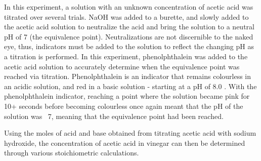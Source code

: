 In this experiment, a solution with an unknown concentration of acetic acid was titrated over several trials. NaOH was added to a burette, and slowly added to the acetic acid solution to neutralize the acid and bring the solution to a neutral pH of 7 (the equivalence point). Neutralizations are not discernible to the naked eye, thus, indicators must be added to the solution to reflect the changing pH as a titration is performed. In this experiment, phenolphthalein was added to the acetic acid solution to accurately determine when the equivalence point was reached via titration. Phenolphthalein is an indicator that remains colourless in an acidic solution, and red in a basic solution - starting at a pH of 8.0 \cite{noauthor_phenolphthalein_nodate}. With the phenolphthalein indicator, reaching a point where the solution became pink for 10+ seconds before becoming colourless once again meant that the pH of the solution was ~7, meaning that the equivalence point had been reached. 

Using the moles of acid and base obtained from titrating acetic acid with sodium hydroxide, the concentration of acetic acid in vinegar can then be determined through various stoichiometric calculations. 

